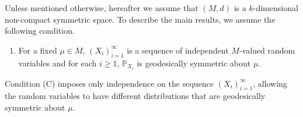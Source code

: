 \documentclass[preprint]{imsart}
\theoremstyle{plain}
\theoremstyle{remark}
\begin{document}
Unless mentioned otherwise, hereafter we assume that $(M, d)$ is a $k$-dimensional non-compact symmetric space. 
To describe the main results, we assume the following condition. %
\begin{enumerate}
 \item[(C)] For a fixed $\mu \in M$, $(X_{i})_{i=1}^{\infty}$ is a sequence of independent $M$-valued random variables and for each $i\ge 1$, $\mathbb{P}_{X_{i}}$ is geodesically symmetric about $\mu$.
\end{enumerate}
Condition (C) imposes only independence on the sequence $(X_i)_{i=1}^{\infty}$, allowing the random variables to have different distributions that are geodesically symmetric about $\mu$.
\end{document}

